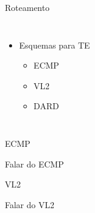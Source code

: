 \documentclass[aspectratio=169]{beamer}
\begin{document}
 
    \begin{frame} {Roteamento}
      				
                  \begin{columns}[t]    
                  	
                    
                    \begin{itemize}
                     
                    \setlength\itemsep{2em}
                       \large
                       \item
                          Esquemas para TE
                           
                       \begin{itemize}
                           
                           \item
                              	ECMP
                       
                           \item
                              	VL2
                       
                            \item
                               DARD 
                                       
                       \end{itemize}
                               
                    \end{itemize}
                   
                      
                 \end{columns} 
                
    \end{frame}
       

 
    \begin{frame} {ECMP}
      				
   
	  Falar do ECMP
	        
                
    \end{frame}     
    
    
    
 
    \begin{frame} {VL2}
      				
   
	  Falar do VL2
	        
                
    \end{frame}     
    
\end{document}
